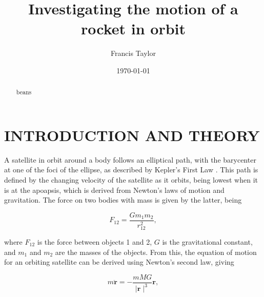 \documentclass[twocolumn,prl,nobalancelastpage,aps,10pt]{revtex4-1}
\begin{document}
\title{Investigating the motion of a rocket in orbit}

\author{Francis Taylor}


\date{\today}

\begin{abstract} beans

\end{abstract}


\maketitle

\section{INTRODUCTION AND THEORY}

A satellite in orbit around a body follows an elliptical path, with the barycenter at one of the foci of the ellipse, as described by Kepler's First Law \cite{Kepler1992}. This path is defined by the changing velocity of the satellite as it orbits, being lowest when it is at the apoapsis,  which is derived from Newton's laws of motion and gravitation. The force on two bodies with mass is given by the latter, being \cite{Newton1848}

\begin{equation}\label{universalGravitation}
	F_{12} = \frac{G m_{1}m_{2}}{r_{12}^{2}} ,
\end{equation}

where $F_{12}$ is the force between objects 1 and 2, $G$ is the gravitational constant, and $m_{1}$ and $m_{2}$ are the masses of the objects. From this, the equation of motion for an orbiting satellite can be derived using Newton's second law, giving 

\begin{equation}\label{equationMotion}
m \boldsymbol{\ddot{r}} = - \frac{mMG}{\mid\boldsymbol{r}\mid^{3}}\boldsymbol{r} ,
\end{equation}
\end{document}
